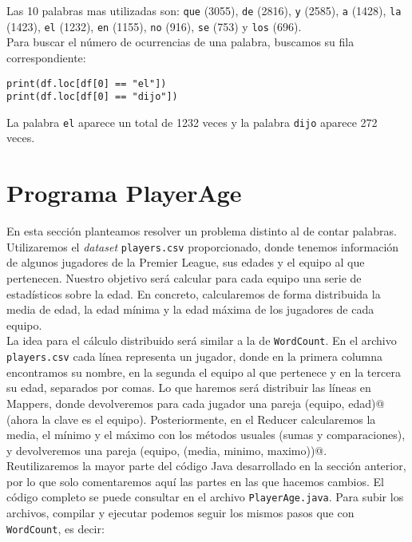 \documentclass[11pt]{article}
\begin{document}
Las 10 palabras mas utilizadas son: \texttt{que} (3055), \texttt{de} (2816), \texttt{y} (2585), \texttt{a} (1428), \texttt{la} (1423), \texttt{el} (1232), \texttt{en} (1155), \texttt{no} (916), \texttt{se} (753) y \texttt{los} (696).\\

Para buscar el número de ocurrencias de una palabra, buscamos su fila correspondiente:
\begin{verbatim}
print(df.loc[df[0] == "el"])
print(df.loc[df[0] == "dijo"])
\end{verbatim}

La palabra \texttt{el} aparece un total de 1232 veces y la palabra \texttt{dijo} aparece 272 veces.

\section{Programa PlayerAge}

En esta sección planteamos resolver un problema distinto al de contar palabras. Utilizaremos el \textit{dataset} \verb|players.csv| proporcionado, donde tenemos información de algunos jugadores de la Premier League, sus edades y el equipo al que pertenecen. Nuestro objetivo será calcular para cada equipo una serie de estadísticos sobre la edad. En concreto, calcularemos de forma distribuida la media de edad, la edad mínima y la edad máxima de los jugadores de cada equipo.\\

La idea para el cálculo distribuido será similar a la de \verb|WordCount|. En el archivo \verb|players.csv| cada línea representa un jugador, donde en la primera columna encontramos su nombre, en la segunda el equipo al que pertenece y en la tercera su edad, separados por comas. Lo que haremos será distribuir las líneas en Mappers, donde devolveremos para cada jugador una pareja \verb@(equipo, edad)@ (ahora la clave es el equipo). Posteriormente, en el Reducer calcularemos la media, el mínimo y el máximo con los métodos usuales (sumas y comparaciones), y devolveremos una pareja \verb@(equipo, (media, minimo, maximo))@.\\

Reutilizaremos la mayor parte del código Java desarrollado en la sección anterior, por lo que solo comentaremos aquí las partes en las que hacemos cambios. El código completo se puede consultar en el archivo \verb|PlayerAge.java|. Para subir los archivos, compilar y ejecutar podemos seguir los mismos pasos que con \verb|WordCount|, es decir:
\end{document}
